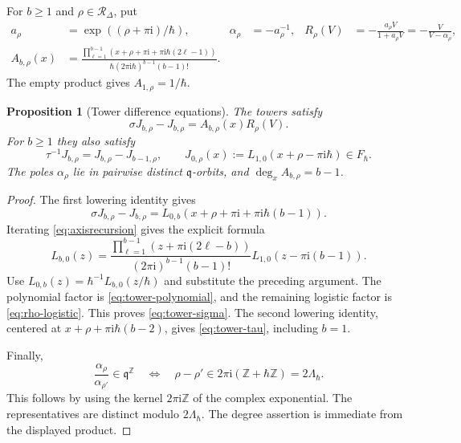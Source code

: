 \documentclass[11pt]{article}
\numberwithin{equation}{section}
\newtheorem{proposition}[proposition]{Proposition}
\theoremstyle{definition}
\theoremstyle{remark}
\newcommand{\Z}{\mathbb Z}
\newcommand{\ii}{\mathrm i}
\newcommand{\qh}{\hbar}
\begin{document}
For $b\geq1$ and $\rho\in\mathscr R_\Delta$, put
\begin{align}
 a_\rho&=\exp((\rho+\pi\ii)/\qh),&
 \alpha_\rho&=-a_\rho^{-1},&
 R_\rho(V)&=-\frac{a_\rho V}{1+a_\rho V}
           =-\frac{V}{V-\alpha_\rho},\label{eq:rho-logistic}\\
 A_{b,\rho}(x)&=
 \frac{\displaystyle\prod_{\ell=1}^{b-1}
 (x+\rho+\pi\ii+\pi\ii\qh(2\ell-1))}
 {\qh(2\pi\ii\qh)^{b-1}(b-1)!}.&&&\label{eq:tower-polynomial}
\end{align}
The empty product gives $A_{1,\rho}=1/\qh$.

\begin{proposition}[Tower difference equations]\label{prop:tower-increments}
The towers satisfy
\begin{equation}\label{eq:tower-sigma}
 \sigma J_{b,\rho}-J_{b,\rho}=A_{b,\rho}(x)R_\rho(V).
\end{equation}
For $b\geq1$ they also satisfy
\begin{equation}\label{eq:tower-tau}
 \tau^{-1}J_{b,\rho}=J_{b,\rho}-J_{b-1,\rho},
 \qquad J_{0,\rho}(x):=L_{1,0}(x+\rho-\pi\ii\qh)\in F_\qh.
\end{equation}
The poles $\alpha_\rho$ lie in pairwise distinct $\mathfrak q$-orbits, and
$\deg_xA_{b,\rho}=b-1$.
\end{proposition}
\begin{proof}
The first lowering identity gives
\[
 \sigma J_{b,\rho}-J_{b,\rho}
 =L_{0,b}(x+\rho+\pi\ii+\pi\ii\qh(b-1)).
\]
Iterating \eqref{eq:axisrecursion} gives the explicit formula
\begin{equation}\label{eq:axis-product}
 L_{b,0}(z)=
 \frac{\displaystyle\prod_{\ell=1}^{b-1}(z+\pi\ii(2\ell-b))}
 {(2\pi\ii)^{b-1}(b-1)!}
 L_{1,0}(z-\pi\ii(b-1)).
\end{equation}
Use $L_{0,b}(z)=\qh^{-1}L_{b,0}(z/\qh)$ and substitute the preceding
argument. The polynomial factor is \eqref{eq:tower-polynomial}, and the
remaining logistic factor is \eqref{eq:rho-logistic}. This proves
\eqref{eq:tower-sigma}. The second lowering identity, centered at
$x+\rho+\pi\ii\qh(b-2)$, gives \eqref{eq:tower-tau}, including $b=1$.

Finally,
\[
 \frac{\alpha_\rho}{\alpha_{\rho'}}\in\mathfrak q^{\Z}
 \quad\Longleftrightarrow\quad
 \rho-\rho'\in2\pi\ii(\Z+\qh\Z)=2\Lambda_\qh.
\]
This follows by using the kernel $2\pi\ii\Z$ of the complex exponential.
The representatives are distinct modulo $2\Lambda_\qh$. The degree assertion
is immediate from the displayed product.
\end{proof}
\end{document}
